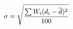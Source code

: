 \documentclass[10pt]{article}
\begin{document}
\begin{align*}\sigma = \sqrt{ {\sum W_i(d_i-\overline d)^2\over 100} }\end{align*}
\end{document}
